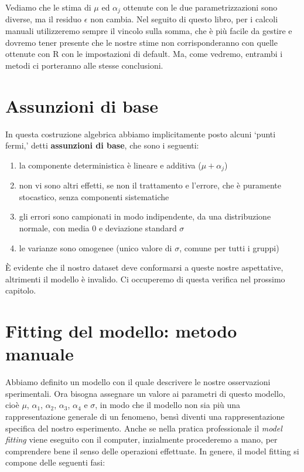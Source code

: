 \documentclass[a4paper,12pt,oneside]{book}
\providecommand{\tightlist}{%
  \setlength{\itemsep}{0pt}\setlength{\parskip}{0pt}}
\begin{document}
Vediamo che le stima di \(\mu\) ed \(\alpha_j\) ottenute con le due parametrizzazioni sono diverse, ma il residuo \(\epsilon\) non cambia. Nel seguito di questo libro, per i calcoli manuali utilizzeremo sempre il vincolo sulla somma, che è più facile da gestire e dovremo tener presente che le nostre stime non corrisponderanno con quelle ottenute con R con le impostazioni di default. Ma, come vedremo, entrambi i metodi ci porteranno alle stesse conclusioni.

\hypertarget{assunzioni-di-base}{%
\section{Assunzioni di base}\label{assunzioni-di-base}}

In questa costruzione algebrica abbiamo implicitamente posto alcuni `punti fermi,' detti \textbf{assunzioni di base}, che sono i seguenti:

\begin{enumerate}
\def\labelenumi{\arabic{enumi}.}
\tightlist
\item
  la componente deterministica è lineare e additiva (\(\mu + \alpha_j\))
\item
  non vi sono altri effetti, se non il trattamento e l'errore, che è puramente stocastico, senza componenti sistematiche
\item
  gli errori sono campionati in modo indipendente, da una distribuzione normale, con media 0 e deviazione standard \(\sigma\)
\item
  le varianze sono omogenee (unico valore di \(\sigma\), comune per tutti i gruppi)
\end{enumerate}

È evidente che il nostro dataset deve conformarsi a queste nostre aspettative, altrimenti il modello è invalido. Ci occuperemo di questa verifica nel prossimo capitolo.

\hypertarget{fitting-del-modello-metodo-manuale}{%
\section{Fitting del modello: metodo manuale}\label{fitting-del-modello-metodo-manuale}}

Abbiamo definito un modello con il quale descrivere le nostre osservazioni sperimentali. Ora bisogna assegnare un valore ai parametri di questo modello, cioè \(\mu\), \(\alpha_1\), \(\alpha_2\), \(\alpha_3\), \(\alpha_4\) e \(\sigma\), in modo che il modello non sia più una rappresentazione generale di un fenomeno, bensì diventi una rappresentazione specifica del nostro esperimento. Anche se nella pratica professionale il \emph{model fitting} viene eseguito con il computer, inzialmente procederemo a mano, per comprendere bene il senso delle operazioni effettuate. In genere, il model fitting si compone delle seguenti fasi:
\end{document}
